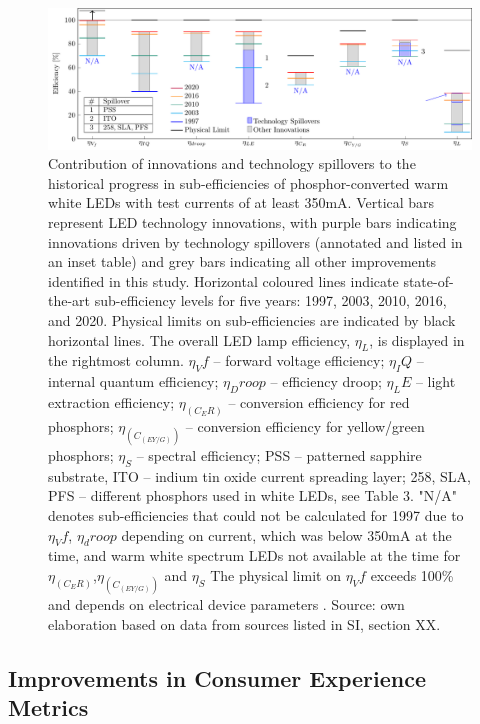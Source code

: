 \documentclass[twoside,twocolumn,9pt]{article}
\begin{document}
\begin{figure}[h!]
 \centering
 \includegraphics[width=\textwidth]{2_SSL_EES/article/figures/breakthroughs_efficiency.pdf}
 \caption{Contribution of innovations and technology spillovers to the historical progress in sub-efficiencies of phosphor-converted warm white LEDs with test currents of at least 350mA. Vertical bars represent LED technology innovations, with purple bars indicating innovations driven by technology spillovers (annotated and listed in an inset table) and grey bars indicating all other improvements identified in this study. Horizontal coloured lines indicate state-of-the-art sub-efficiency levels for five years: 1997, 2003, 2010, 2016, and 2020. Physical limits on sub-efficiencies are indicated by black horizontal lines. The overall LED lamp efficiency, $\eta_L$, is displayed in the rightmost column. $\eta_Vf$ – forward voltage efficiency; $\eta_IQ$ – internal quantum efficiency; $\eta_Droop$ – efficiency droop; $\eta_LE$ – light extraction efficiency; $\eta_(C_ER)$ – conversion efficiency for red phosphors; $\eta_(C_(EY/G))$ – conversion efficiency for yellow/green phosphors; $\eta_S$ – spectral efficiency; PSS – patterned sapphire substrate, ITO – indium tin oxide current spreading layer; 258, SLA, PFS – different phosphors used in white LEDs, see Table 3. "N/A" denotes sub-efficiencies that could not be calculated for 1997 due to $\eta_Vf$, $\eta_droop$ depending on current, which was below 350mA at the time, and warm white spectrum LEDs not available at the time for $\eta_(C_ER)$,$\eta_(C_(EY/G))$  and $\eta_S$ The physical limit on $\eta_Vf$ exceeds 100\% and depends on electrical device parameters \cite{david2016electrical}. Source: own elaboration based on data from sources listed in SI, section XX.}
 \label{fgr:breakthroughs_efficiency}
\end{figure}

\subsection{Improvements in Consumer Experience Metrics}
\end{document}
